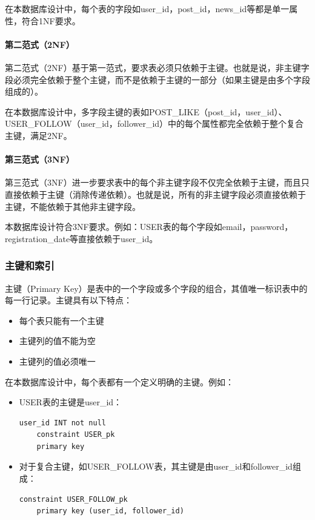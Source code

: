 在本数据库设计中，每个表的字段如user\_id，post\_id，news\_id等都是单一属性，符合1NF要求。

\paragraph{第二范式（2NF）}

第二范式（2NF）基于第一范式，要求表必须只依赖于主键。也就是说，非主键字段必须完全依赖于整个主键，而不是依赖于主键的一部分（如果主键是由多个字段组成的）。

在本数据库设计中，多字段主键的表如POST\_LIKE（post\_id，user\_id）、USER\_FOLLOW（user\_id，follower\_id）中的每个属性都完全依赖于整个复合主键，满足2NF。

\paragraph{第三范式（3NF）}

第三范式（3NF）进一步要求表中的每个非主键字段不仅完全依赖于主键，而且只直接依赖于主键（消除传递依赖）。也就是说，所有的非主键字段必须直接依赖于主键，不能依赖于其他非主键字段。

本数据库设计符合3NF要求。例如：USER表的每个字段如email，password，registration\_date等直接依赖于user\_id。

\subsubsection{主键和索引}

主键（Primary Key）是表中的一个字段或多个字段的组合，其值唯一标识表中的每一行记录。主键具有以下特点：

\begin{itemize}
    \item 每个表只能有一个主键
    \item 主键列的值不能为空
    \item 主键列的值必须唯一
\end{itemize}

在本数据库设计中，每个表都有一个定义明确的主键。例如：

\begin{itemize}
    \item USER表的主键是user\_id：
          \begin{verbatim}
user_id INT not null
    constraint USER_pk
    primary key
          \end{verbatim}
    \item 对于复合主键，如USER\_FOLLOW表，其主键是由user\_id和follower\_id组成：
          \begin{verbatim}
constraint USER_FOLLOW_pk
    primary key (user_id, follower_id)
          \end{verbatim}
\end{itemize}

